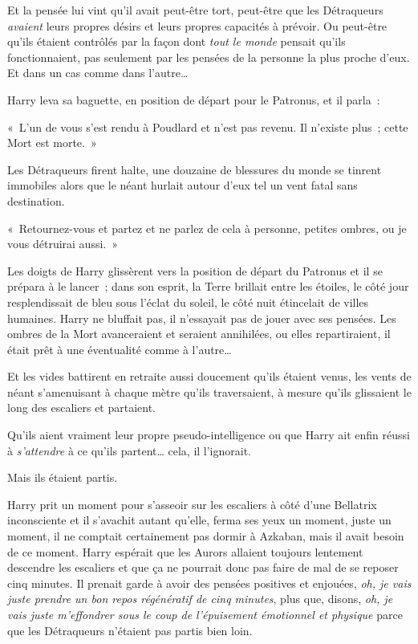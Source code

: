 Et la pensée lui vint qu'il avait peut-être tort, peut-être que les Détraqueurs \emph{avaient} leurs propres désirs et leurs propres capacités à prévoir.
Ou peut-être qu'ils étaient contrôlés par la façon dont \emph{tout le monde} pensait qu'ils fonctionnaient, pas seulement par les pensées de la personne la plus proche d'eux.
Et dans un cas comme dans l'autre…

Harry leva sa baguette, en position de départ pour le Patronus, et il parla~:

«~L'un de vous s'est rendu à Poudlard et n'est pas revenu.
Il n'existe plus~; cette Mort est morte.~»

Les Détraqueurs firent halte, une douzaine de blessures du monde se tinrent immobiles alors que le néant hurlait autour d'eux tel un vent fatal sans destination.

«~Retournez-vous et partez et ne parlez de cela à personne, petites ombres, ou je vous détruirai aussi.~»

Les doigts de Harry glissèrent vers la position de départ du Patronus et il se prépara à le lancer~; dans son esprit, la Terre brillait entre les étoiles, le côté jour resplendissait de bleu sous l'éclat du soleil, le côté nuit étincelait de villes humaines.
Harry ne bluffait pas, il n'essayait pas de jouer avec ses pensées.
Les ombres de la Mort avanceraient et seraient annihilées, ou elles repartiraient, il était prêt à une éventualité comme à l'autre…

Et les vides battirent en retraite aussi doucement qu'ils étaient venus, les vents de néant s'amenuisant à chaque mètre qu'ils traversaient, à mesure qu'ils glissaient le long des escaliers et partaient.

Qu'ils aient vraiment leur propre pseudo-intelligence ou que Harry ait enfin réussi à \emph{s'attendre} à ce qu'ils partent… cela, il l'ignorait.

Mais ils étaient partis.

Harry prit un moment pour s'asseoir sur les escaliers à côté d'une Bellatrix inconsciente et il s'avachit autant qu'elle, ferma ses yeux un moment, juste un moment, il ne comptait certainement pas dormir à Azkaban, mais il avait besoin de ce moment.
Harry espérait que les Aurors allaient toujours lentement descendre les escaliers et que ça ne pourrait donc pas faire de mal de se reposer cinq minutes.
Il prenait garde à avoir des pensées positives et enjouées, \emph{oh, je vais juste prendre un bon repos régénératif de cinq minutes}, plus que, disons, \emph{oh, je vais juste m'effondrer sous le coup de l'épuisement émotionnel et physique} parce que les Détraqueurs n'étaient pas partis bien loin.

